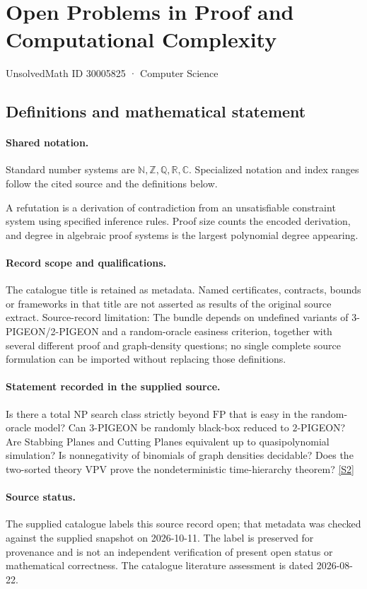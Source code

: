 \documentclass[11pt]{article}
\newcommand{\sref}[2]{\hyperlink{source:#1:#2}{[S#2]}}
\begin{document}
\setcounter{section}{30005824}
\section{Open Problems in Proof and Computational Complexity}\label{30005825}
{\small\sffamily UnsolvedMath ID 30005825 · Computer Science}
\subsection{Definitions and mathematical statement}

\paragraph{Shared notation.}Standard number systems are $\mathbb N,\mathbb Z,\mathbb Q,\mathbb R,\mathbb C$. Specialized notation and index ranges follow the cited source and the definitions below.


A refutation is a derivation of contradiction from an unsatisfiable constraint system using specified inference rules. Proof size counts the encoded derivation, and degree in algebraic proof systems is the largest polynomial degree appearing.
\paragraph{Record scope and qualifications.}
The catalogue title is retained as metadata. Named certificates, contracts, bounds or frameworks in that title are not asserted as results of the original source extract.
Source-record limitation: The bundle depends on undefined variants of 3-PIGEON/2-PIGEON and a random-oracle easiness criterion, together with several different proof and graph-density questions; no single complete source formulation can be imported without replacing those definitions.
\paragraph{Statement recorded in the supplied source.}
Is there a total NP search class strictly beyond $\mathrm{FP}$ that is easy in the random-oracle model? Can $3$-PIGEON be randomly black-box reduced to $2$-PIGEON? Are Stabbing Planes and Cutting Planes equivalent up to quasipolynomial simulation? Is nonnegativity of binomials of graph densities decidable? Does the two-sorted theory $\mathrm{VPV}$ prove the nondeterministic time-hierarchy theorem? \sref{30005825}{2}
\paragraph{Source status.}
The supplied catalogue labels this source record open; that metadata was checked against the supplied snapshot on 2026-10-11. The label is preserved for provenance and is not an independent verification of present open status or mathematical correctness. The catalogue literature assessment is dated 2026-08-22.
\end{document}

